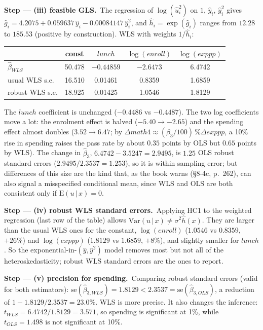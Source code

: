 \documentclass[11pt,a4paper]{article}
\numberwithin{equation}{questao}
\newcommand{\passo}[2]{\par\smallskip\noindent\textbf{Step --- #1.}~#2}
\newcommand{\var}[1]{\mathit{#1}}
\newcommand{\E}{\mathrm{E}}
\begin{document}
\begin{sol}
\passo{(iii) feasible GLS}{The regression of $\log(\hat u_i^2)$ on $1$, $\hat y_i$, $\hat y_i^2$ gives
$\hat g_i=4.2075+0.059637\,\hat y_i-0.00084147\,\hat y_i^2$, and $\hat h_i=\exp(\hat g_i)$ ranges from $12.28$ to $185.53$
(positive by construction). WLS with weights $1/\hat h_i$:
\begin{center}\small
\begin{tabular}{lcccc}
\toprule
 & const & $\var{lunch}$ & $\log(\var{enroll})$ & $\log(\var{exppp})$\\
\midrule
$\hat\beta_{WLS}$ & 50.478 & $-0.44859$ & $-2.6473$ & 6.4742\\
usual WLS s.e. & 16.510 & 0.01461 & 0.8359 & 1.6859\\
robust WLS s.e. & 18.925 & 0.01425 & 1.0546 & 1.8129\\
\bottomrule
\end{tabular}
\end{center}
The $\var{lunch}$ coefficient is unchanged ($-0.4486$ vs $-0.4487$). The two log coefficients move a lot: the
enrolment effect is halved ($-5.40\to-2.65$) and the spending effect almost doubles ($3.52\to6.47$; by $\Delta\var{math4}\approx(\beta_3/100)\,\%\Delta\var{exppp}$, a 10\%
rise in spending raises the pass rate by about $0.35$ points by OLS but $0.65$ points by WLS). The change in
$\hat\beta_3$, $6.4742-3.5247=2.9495$, is $1.25$ OLS robust standard errors ($2.9495/2.3537=1.253$), so it is
within sampling error; but differences of this size are the kind that, as the book warns (§8-4c, p.~262), can
also signal a misspecified conditional mean, since WLS and OLS are both consistent only if $\E(u\,|\,x)=0$.}

\passo{(iv) robust WLS standard errors}{Applying HC1 to the weighted regression (last row of the table) allows
$\mathrm{Var}(u\,|\,x)\ne\sigma^2\hat h(x)$. They are larger than the usual WLS ones for the constant, $\log(\var{enroll})$
($1.0546$ vs $0.8359$, $+26\%$) and $\log(\var{exppp})$ ($1.8129$ vs $1.6859$, $+8\%$), and slightly smaller for $\var{lunch}$.
So the exponential-in-$(\hat y,\hat y^2)$ model removes most but not all of the heteroskedasticity; robust WLS
standard errors are the ones to report.}

\passo{(v) precision for spending}{Comparing robust standard errors (valid for both estimators):
$\mathrm{se}(\hat\beta_{3,WLS})=1.8129<2.3537=\mathrm{se}(\hat\beta_{3,OLS})$, a reduction of $1-1.8129/2.3537=23.0\%$.
WLS is more precise. It also changes the inference: $t_{WLS}=6.4742/1.8129=3.571$, so spending is significant at 1\%,
while $t_{OLS}=1.498$ is not significant at 10\%.}


\end{sol}
\end{document}
